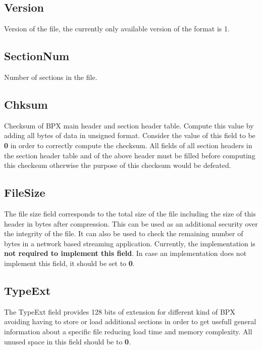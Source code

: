 \subsection{Version}
Version of the file, the currently only available version of the format is 1.

\subsection{SectionNum}
Number of sections in the file.

\subsection{Chksum}
Checksum of BPX main header and section header table. Compute this value by adding all bytes of data in unsigned format. Consider the value of this field to be \textbf{0} in order to correctly compute the checksum.\newline
All fields of all section headers in the section header table and of the above header must be filled before computing this checksum otherwise the purpose of this checksum would be defeated.

\subsection{FileSize}
The file size field corresponds to the total size of the file including the size of this header in bytes after compression.\newline
This can be used as an additional security over the integrity of the file. It can also be used to check the remaining number of bytes in a network based streaming application.\newline
Currently, the implementation is \textbf{not required to implement this field}. In case an implementation does not implement this field, it should be set to \textbf{0}.

\subsection{TypeExt}
The TypeExt field provides 128 bits of extension for different kind of BPX avoiding having to store or load additional sections in order to get usefull general information about a specific file reducing load time and memory complexity.\newline
All unused space in this field should be to \textbf{0}.
